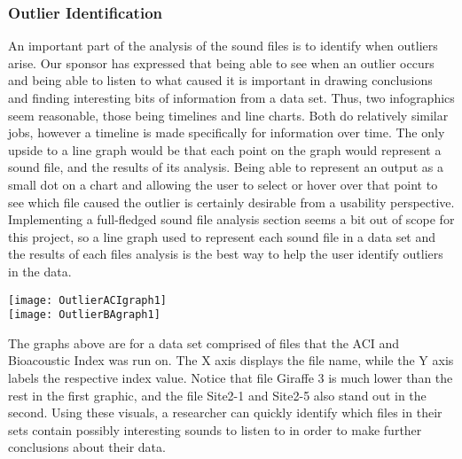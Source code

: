 \subsubsection{Outlier Identification}
An important part of the analysis of the sound files is to identify when outliers arise. Our sponsor has expressed that being able to see when an outlier occurs and being able to listen to what caused it is important in drawing conclusions and finding interesting bits of information from a data set. Thus, two infographics seem reasonable, those being timelines and line charts. Both do relatively similar jobs, however a timeline is made specifically for information over time. The only upside to a line graph would be that each point on the graph would represent a sound file, and the results of its analysis. Being able to represent an output as a small dot on a chart and allowing the user to select or hover over that point to see which file caused the outlier is certainly desirable from a usability perspective. Implementing a full-fledged sound file analysis section seems a bit out of scope for this project, so a line graph used to represent each sound file in a data set and the results of each file\textquotesingle s analysis is the best way to help the user identify outliers in the data.\par

\begin{center}
  \texttt{[image: OutlierACIgraph1]} \\[12pt]
  \texttt{[image: OutlierBAgraph1]} \\[12pt]
\end{center}
The graphs above are for a data set comprised of files that the ACI and Bioacoustic Index was run on. The X axis displays the file name, while the Y axis labels the respective index value. Notice that file Giraffe 3 is much lower than the rest in the first graphic, and the file Site2-1 and Site2-5 also stand out in the second. Using these visuals, a researcher can quickly identify which files in their sets contain possibly interesting sounds to listen to in order to make further conclusions about their data.

